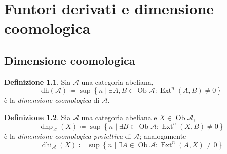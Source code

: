 \documentclass[a4paper,11pt,oneside]{book}
\newcommand{\A}{\mathcal{A}}
\newcommand{\set}[1]{\left\{ #1 \right\}}
\renewcommand{\dh}{\mathrm{dh}}
\DeclareMathOperator{\Ob}{Ob}
\DeclareMathOperator{\Ext}{Ext}
\DeclareMathOperator{\dhp}{dhp}
\DeclareMathOperator{\dhi}{dhi}
\theoremstyle{definition}
\newtheorem{de}{Definizione}
\newtheorem{prop}{Proposizione}
\begin{document}
 \chapter{Funtori derivati e dimensione coomologica}
 \section{Dimensione coomologica}
 \begin{de}
  Sia $\A$ una categoria abeliana, 
   \[
    \dh(\A)\coloneqq \sup \set{n \mid \exists A,B\in\Ob\A \colon \Ext^n(A,B)\neq 0}
   \]
  è la \emph{dimensione coomologica} di $\A$.
 \end{de}
\begin{de}
  Sia $\A$ una categoria abeliana e $X\in\Ob\A$, 
   \[
    \dhp_\A(X)\coloneqq \sup \set{n \mid \exists B\in\Ob\A \colon \Ext^n(X,B)\neq 0}
   \]
  è la \emph{dimensione coomologica proiettiva} di $\A$; analogamente
  \[
    \dhi_\A(X)\coloneqq \sup \set{n \mid \exists A\in\Ob\A \colon \Ext^n(A,X)\neq 0}
  \]
 \end{de}
 
\end{document}
